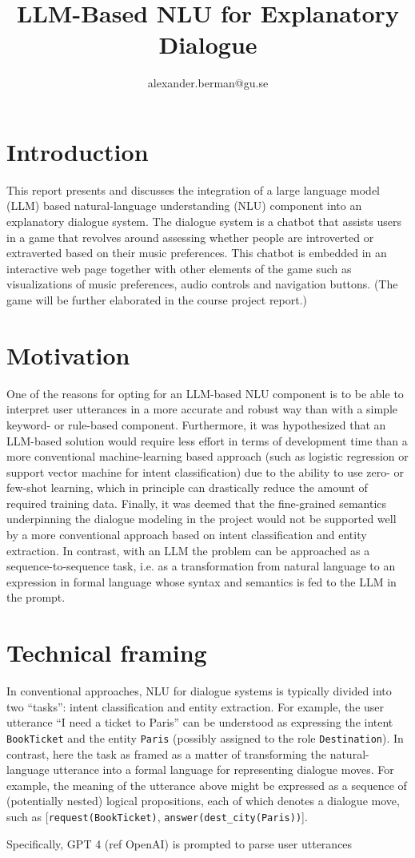 \documentclass[11pt]{article}
\title{LLM-Based NLU for Explanatory Dialogue}
\author{alexander.berman@gu.se}
\begin{document}
\maketitle

\section{Introduction}
This report presents and discusses the integration of a large language model (LLM) based natural-language understanding (NLU) component into an explanatory dialogue system. The dialogue system is a chatbot that assists users in a game that revolves around assessing whether people are introverted or extraverted based on their music preferences. This chatbot is embedded in an interactive web page together with other elements of the game such as visualizations of music preferences, audio controls and navigation buttons. (The game will be further elaborated in the course project report.)

\section{Motivation}
One of the reasons for opting for an LLM-based NLU component is to be able to interpret user utterances in a more accurate and robust way than with a simple keyword- or rule-based component. Furthermore, it was hypothesized that an LLM-based solution would require less effort in terms of development time than a more conventional machine-learning based approach (such as logistic regression or support vector machine for intent classification) due to the ability to use zero- or few-shot learning, which in principle can drastically reduce the amount of required training data. Finally, it was deemed that the fine-grained semantics underpinning the dialogue modeling in the project would not be supported well by a more conventional approach based on intent classification and entity extraction. In contrast, with an LLM the problem can be approached as a sequence-to-sequence task, i.e. as a transformation from natural language to an expression in formal language whose syntax and semantics is fed to the LLM in the prompt.

\section{Technical framing}
In conventional approaches, NLU for dialogue systems is typically divided into two ``tasks'': intent classification and entity extraction. For example, the user utterance ``I need a ticket to Paris'' can be understood as expressing the intent \texttt{BookTicket} and the entity \texttt{Paris} (possibly assigned to the role \texttt{Destination}). In contrast, here the task as framed as a matter of transforming the natural-language utterance into a formal language for representing dialogue moves. For example, the meaning of the utterance above might be expressed as a sequence of (potentially nested) logical propositions, each of which denotes a dialogue move, such as [\texttt{request(BookTicket)}, \texttt{answer(dest\_city(Paris))}].


Specifically, GPT 4 (ref OpenAI) is prompted to parse user utterances
\end{document}

